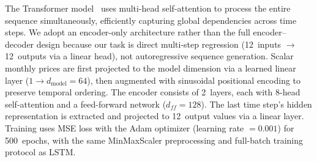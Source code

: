 \documentclass[journal]{IEEEtran}
\begin{document}
The Transformer model~\cite{vaswani2017attention} uses multi-head self-attention to process the entire sequence simultaneously, efficiently capturing global dependencies across time steps. We adopt an encoder-only architecture rather than the full encoder--decoder design because our task is direct multi-step regression (12~inputs $\to$ 12~outputs via a linear head), not autoregressive sequence generation. Scalar monthly prices are first projected to the model dimension via a learned linear layer ($1 \to d_{\text{model}} = 64$), then augmented with sinusoidal positional encoding to preserve temporal ordering. The encoder consists of 2~layers, each with 8-head self-attention and a feed-forward network ($d_{ff} = 128$). The last time step's hidden representation is extracted and projected to 12~output values via a linear layer. Training uses MSE loss with the Adam optimizer (learning rate $= 0.001$) for 500~epochs, with the same MinMaxScaler preprocessing and full-batch training protocol as LSTM.
\end{document}
